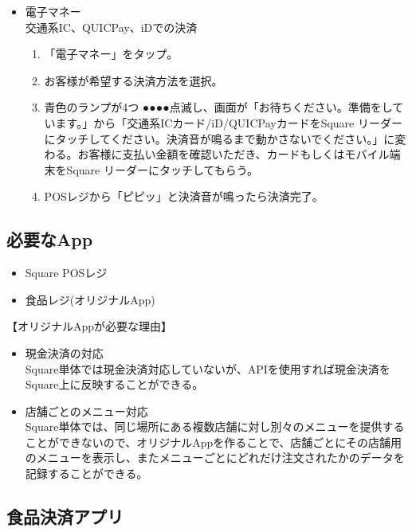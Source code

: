 \documentclass[a4paper]{ltjsreport}
\begin{document}
\begin{itemize}
\begin{itemize}
        \end{itemize}
  \item 電子マネー\\
        交通系IC、QUICPay、iDでの決済
        \begin{enumerate}[手順1]
          \item 「電子マネー」をタップ。
          \item お客様が希望する決済方法を選択。
          \item 青色のランプが4つ{\color{blue} ●●●●}点滅し、画面が「お待ちください。準備をしています。」から「交通系ICカード/iD/QUICPayカードをSquare リーダーにタッチしてください。決済音が鳴るまで動かさないでください。」に変わる。お客様に支払い金額を確認いただき、カードもしくはモバイル端末をSquare リーダーにタッチしてもらう。
          \item POSレジから「ピピッ」と決済音が鳴ったら決済完了。
        \end{enumerate}
\end{itemize}
\subsection{必要なApp}
\begin{itemize}
  \item Square POSレジ
  \item 食品レジ(オリジナルApp)
\end{itemize}
\begin{itembox}[l]{【オリジナルAppが必要な理由】}
  \begin{itemize}
    \item 現金決済の対応\\
          Square単体では現金決済対応していないが、APIを使用すれば現金決済をSquare上に反映することができる。
    \item 店舗ごとのメニュー対応\\
          Square単体では、同じ場所にある複数店舗に対し別々のメニューを提供することができないので、オリジナルAppを作ることで、店舗ごとにその店舗用のメニューを表示し、またメニューごとにどれだけ注文されたかのデータを記録することができる。
  \end{itemize}
\end{itembox}
\subsection{食品決済アプリ}
\end{document}
